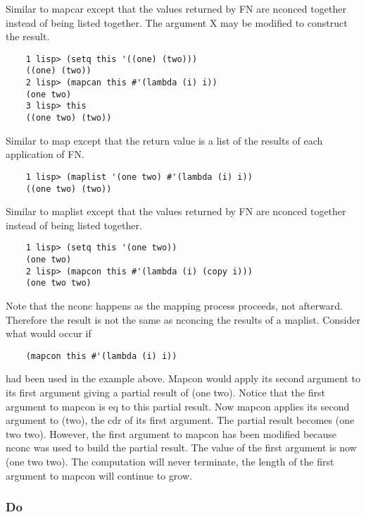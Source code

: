 {    Similar to mapcar except that the values returned by FN  are
    nconced  together  instead  of  being  listed together.  The
    argument X may be modified to construct the result.
}
\begin{verbatim}
    1 lisp> (setq this '((one) (two)))
    ((one) (two))
    2 lisp> (mapcan this #'(lambda (i) i))
    (one two)
    3 lisp> this
    ((one two) (two))
\end{verbatim}

{    Similar to map except that the return value is a list of the
    results of each application of FN.
}
\begin{verbatim}
    1 lisp> (maplist '(one two) #'(lambda (i) i))
    ((one two) (two))
\end{verbatim}

{    Similar to maplist except that the values returned by FN are
    nconced together instead of being listed together.
}
\begin{verbatim}
    1 lisp> (setq this '(one two))
    (one two)
    2 lisp> (mapcon this #'(lambda (i) (copy i)))
    (one two two)
\end{verbatim}
    Note that the nconc happens as the mapping process proceeds,
    not afterward.  Therefore the result  is  not  the  same  as
    nconcing  the  results  of  a  maplist.  Consider what would
    occur if

\begin{verbatim}
    (mapcon this #'(lambda (i) i))
\end{verbatim}
    had been used in the example above.  Mapcon would apply  its
    second  argument  to  its  first  argument  giving a partial
    result of (one two).  Notice  that  the  first  argument  to
    mapcon is eq to this partial result.  Now mapcon applies its
    second  argument  to  (two),  the cdr of its first argument.
    The partial result becomes (one  two  two).    However,  the
    first argument to mapcon has been modified because nconc was
    used  to  build  the partial result.  The value of the first
    argument is now (one two two).  The computation  will  never
    terminate,   the length of the first argument to mapcon will
    continue to grow.

\subsubsection{Do}


